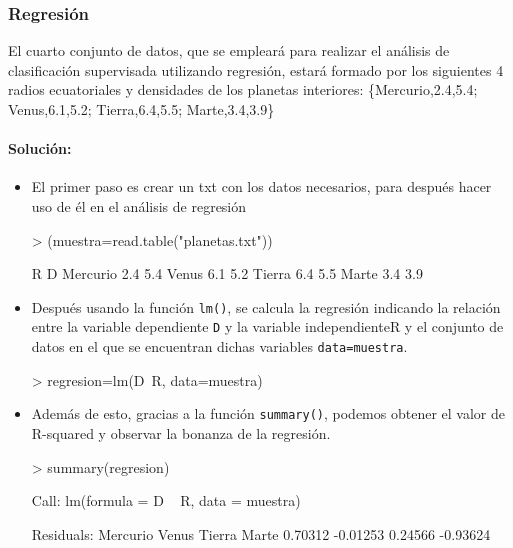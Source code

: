 \documentclass[a4paper, 12pt]{article}
\begin{document}
	\subsubsection{Regresión}
	
	El cuarto conjunto de datos, que se empleará para realizar el análisis de clasificación supervisada utilizando regresión, estará formado por los siguientes 4 radios ecuatoriales y densidades de los planetas interiores: \{Mercurio,2.4,5.4; Venus,6.1,5.2; Tierra,6.4,5.5; Marte,3.4,3.9\}
	
	\paragraph{Solución:}
	\begin{itemize}
	  \item El primer paso es crear un txt con los datos necesarios, para después hacer uso de él en el análisis de regresión
\begin{Schunk}
\begin{Sinput}
> (muestra=read.table("planetas.txt"))
\end{Sinput}
\begin{Soutput}
           R   D
Mercurio 2.4 5.4
Venus    6.1 5.2
Tierra   6.4 5.5
Marte    3.4 3.9
\end{Soutput}
\end{Schunk}
	
	  \item Después usando la función \texttt{lm()}, se calcula la regresión indicando la relación entre la variable dependiente \texttt{D} y la variable independiente{R} y el conjunto de datos en el que se encuentran dichas variables \texttt{data=muestra}.
\begin{Schunk}
\begin{Sinput}
> regresion=lm(D~R, data=muestra)  
\end{Sinput}
\end{Schunk}

    	  \item Además de esto, gracias a la función \texttt{summary()}, podemos obtener el valor de R-squared y observar la bonanza de la regresión.
\begin{Schunk}
\begin{Sinput}
> summary(regresion)
\end{Sinput}
\begin{Soutput}
Call:
lm(formula = D ~ R, data = muestra)

Residuals:
Mercurio    Venus   Tierra    Marte 
 0.70312 -0.01253  0.24566 -0.93624 


\end{Soutput}
\end{Schunk}
\end{itemize}
\end{document}
